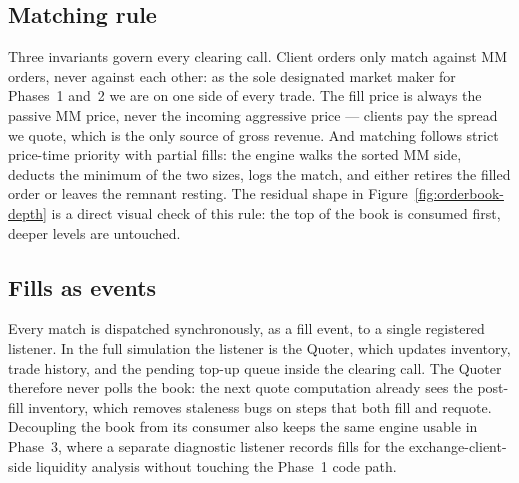 \subsection{Matching rule}
\label{sec:orderbook-match}

Three invariants govern every clearing call. Client orders only
match against MM orders, never against each other: as the sole
designated market maker for Phases~1 and~2 we are on one side of
every trade. The fill price is always the passive MM price,
never the incoming aggressive price --- clients pay the spread we
quote, which is the only source of gross revenue. And matching
follows strict price-time priority with partial fills: the engine
walks the sorted MM side, deducts the minimum of the two sizes, logs
the match, and either retires the filled order or leaves the remnant
resting. The residual shape in Figure~\ref{fig:orderbook-depth} is a
direct visual check of this rule: the top of the book is consumed
first, deeper levels are untouched.

\subsection{Fills as events}
\label{sec:orderbook-events}

Every match is dispatched synchronously, as a fill event, to a single
registered listener. In the full simulation the listener is the
Quoter, which updates inventory, trade history, and the pending
top-up queue inside the clearing call. The Quoter therefore never
polls the book: the next quote computation already sees the post-fill
inventory, which removes staleness bugs on steps that both fill and
requote. Decoupling the book from its consumer also keeps the same
engine usable in Phase~3, where a separate diagnostic listener
records fills for the exchange-client-side liquidity analysis without
touching the Phase~1 code path.

